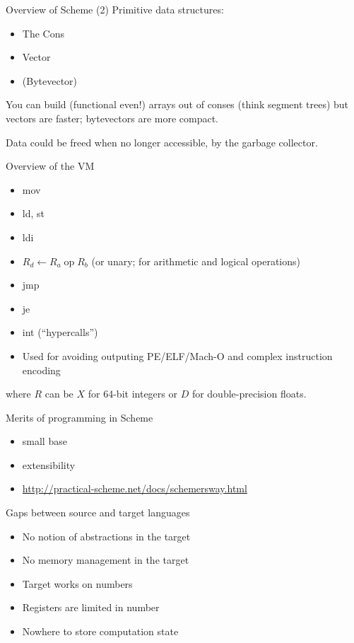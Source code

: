 \documentclass{beamer}
\begin{document}
\begin{frame}{Overview of Scheme (2)}
  Primitive data structures:
  \begin{itemize}
  \item The Cons
  \item Vector
  \item (Bytevector)
  \end{itemize}

  You can build (functional even!) arrays out of conses (think segment trees) but vectors are faster; bytevectors are more compact.

  Data could be freed when no longer accessible, by the garbage collector.
\end{frame}

\begin{frame}{Overview of the VM}
  \begin{itemize}
  \item mov
  \item ld, st
  \item ldi
  \item $R_d\gets R_a\operatorname{op}R_b$ (or unary; for arithmetic and logical operations)
  \item jmp
  \item je
  \item int (``hypercalls'')
  \item Used for avoiding outputing PE/ELF/Mach-O and complex instruction encoding
  \end{itemize}

  where $R$ can be $X$ for 64-bit integers or $D$ for double-precision floats.
\end{frame}

\begin{frame}{Merits of programming in Scheme}
  \begin{itemize}
  \item small base
  \item extensibility
  \item \url{http://practical-scheme.net/docs/schemersway.html}
  \end{itemize}
\end{frame}

\begin{frame}{Gaps between source and target languages}
  \begin{itemize}
  \item No notion of abstractions in the target
  \item No memory management in the target
  \item Target works on numbers
  \item Registers are limited in number
  \item Nowhere to store computation state
  \end{itemize}
\end{frame}
\end{document}
